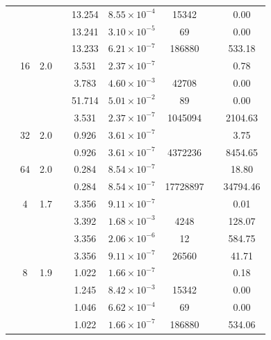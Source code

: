\begin{table}[htbp]
\begin{tabular}{l S[table-format=3.0] S[table-format=4.1] l S[table-format=3.3] S[table-format=1.2e2] S[table-format=6.0] S[table-format=2.0] S[table-format=4.2]}
     &  &  &  & 13.254 & $8.55 \times 10^{-4}$ & 15342 & {\text{---}} & 0.00 \\
     &  &  &  & 13.241 & $3.10 \times 10^{-5}$ & 69 & {\text{---}} & 0.00 \\
     &  &  &  & 13.233 & $6.21 \times 10^{-7}$ & 186880 & {\text{---}} & 533.18 \\
     & 16 & 2.0 &  & 3.531 & $2.37 \times 10^{-7}$ & {\text{---}} & {\text{---}} & 0.78 \\
     &  &  &  & 3.783 & $4.60 \times 10^{-3}$ & 42708 & {\text{---}} & 0.00 \\
     &  &  &  & 51.714 & $5.01 \times 10^{-2}$ & 89 & {\text{---}} & 0.00 \\
     &  &  &  & 3.531 & $2.37 \times 10^{-7}$ & 1045094 & {\text{---}} & 2104.63 \\
     & 32 & 2.0 &  & 0.926 & $3.61 \times 10^{-7}$ & {\text{---}} & {\text{---}} & 3.75 \\
     &  &  &  & 0.926 & $3.61 \times 10^{-7}$ & 4372236 & {\text{---}} & 8454.65 \\
     & 64 & 2.0 &  & 0.284 & $8.54 \times 10^{-7}$ & {\text{---}} & {\text{---}} & 18.80 \\
     &  &  &  & 0.284 & $8.54 \times 10^{-7}$ & 17728897 & {\text{---}} & 34794.46 \\
    \midrule
     & 4 & 1.7 &  & 3.356 & $9.11 \times 10^{-7}$ & {\text{---}} & {\text{---}} & 0.01 \\
     &  &  &  & 3.392 & $1.68 \times 10^{-3}$ & 4248 & {\text{---}} & 128.07 \\
     &  &  &  & 3.356 & $2.06 \times 10^{-6}$ & 12 & {\text{---}} & 584.75 \\
     &  &  &  & 3.356 & $9.11 \times 10^{-7}$ & 26560 & {\text{---}} & 41.71 \\
     & 8 & 1.9 &  & 1.022 & $1.66 \times 10^{-7}$ & {\text{---}} & {\text{---}} & 0.18 \\
     &  &  &  & 1.245 & $8.42 \times 10^{-3}$ & 15342 & {\text{---}} & 0.00 \\
     &  &  &  & 1.046 & $6.62 \times 10^{-4}$ & 69 & {\text{---}} & 0.00 \\
     &  &  &  & 1.022 & $1.66 \times 10^{-7}$ & 186880 & {\text{---}} & 534.06 \\

\end{tabular}
\end{table}
